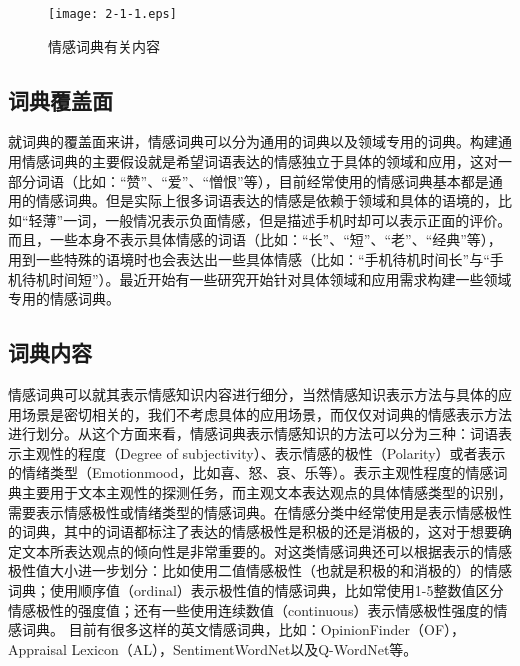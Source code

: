\begin{figure}[htp]
\centering
\texttt{[image: 2-1-1.eps]}
\caption{情感词典有关内容}
\label{fig2-1-1}
\end{figure}

\subsection{词典覆盖面}
就词典的覆盖面来讲，情感词典可以分为通用的词典以及领域专用的词典。构建通用情感词典的主要假设就是希望词语表达的情感独立于具体的领域和应用，这对一部分词语（比如：“赞”、“爱”、“憎恨”等），目前经常使用的情感词典基本都是通用的情感词典。但是实际上很多词语表达的情感是依赖于领域和具体的语境的，比如“轻薄”一词，一般情况表示负面情感，但是描述手机时却可以表示正面的评价。而且，一些本身不表示具体情感的词语（比如：“长”、“短”、“老”、“经典”等），用到一些特殊的语境时也会表达出一些具体情感（比如：“手机待机时间长”与“手机待机时间短”）。最近开始有一些研究开始针对具体领域和应用需求构建一些领域专用的情感词典。

\subsection{词典内容}
情感词典可以就其表示情感知识内容进行细分，当然情感知识表示方法与具体的应用场景是密切相关的，我们不考虑具体的应用场景，而仅仅对词典的情感表示方法进行划分。从这个方面来看，情感词典表示情感知识的方法可以分为三种：词语表示主观性的程度（Degree of subjectivity）、表示情感的极性（Polarity）或者表示的情绪类型（Emotion\/mood，比如喜、怒、哀、乐等）。表示主观性程度的情感词典主要用于文本主观性的探测任务，而主观文本表达观点的具体情感类型的识别，需要表示情感极性或情绪类型的情感词典。在情感分类中经常使用是表示情感极性的词典，其中的词语都标注了表达的情感极性是积极的还是消极的，这对于想要确定文本所表达观点的倾向性是非常重要的。对这类情感词典还可以根据表示的情感极性值大小进一步划分：比如使用二值情感极性（也就是积极的和消极的）的情感词典；使用顺序值（ordinal）表示极性值的情感词典，比如常使用1-5整数值区分情感极性的强度值；还有一些使用连续数值（continuous）表示情感极性强度的情感词典。
目前有很多这样的英文情感词典，比如：OpinionFinder（OF），Appraisal Lexicon（AL），SentimentWordNet以及Q-WordNet等。

